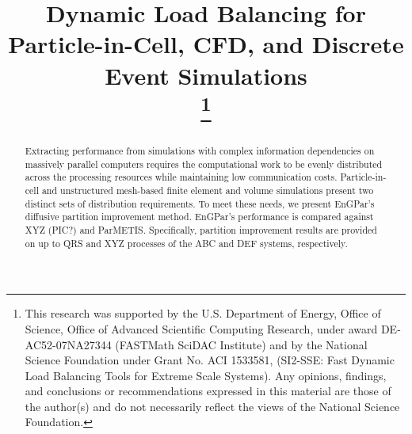 \documentclass[conference]{IEEEtran}
\begin{document}
\title{Dynamic Load Balancing for Particle-in-Cell, CFD, and Discrete Event Simulations\\
\thanks{
This research was supported by the U.S. Department of Energy, Office of
Science, Office of Advanced Scientific Computing Research, under award
DE-AC52-07NA27344 (FASTMath SciDAC Institute) and by the National Science
Foundation under Grant No.  ACI 1533581, (SI2-SSE: Fast Dynamic Load
Balancing Tools for Extreme Scale Systems).
Any opinions, findings, and conclusions or recommendations expressed in this
material are those of the author(s) and do not necessarily reflect the views
of the National Science Foundation.
}}

\author{
\and
{}
\and
{}
}

\maketitle

\begin{abstract}
  Extracting performance from simulations with complex information dependencies
  on massively parallel computers requires the computational work to be evenly
  distributed across the processing resources while maintaining low
  communication costs.
  Particle-in-cell and unstructured mesh-based finite element and volume
  simulations present two distinct sets of distribution requirements.
  To meet these needs, we present EnGPar's diffusive partition improvement
  method.
  EnGPar's performance is compared against XYZ (PIC?) and ParMETIS.
  Specifically, partition improvement results are provided on
  up to QRS and XYZ processes of the ABC and DEF systems, respectively.
\end{abstract}
\end{document}
